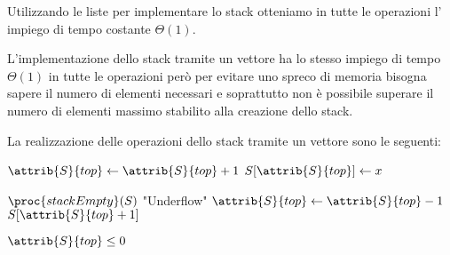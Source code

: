 Utilizzando le liste per implementare lo stack otteniamo in tutte le operazioni l'
impiego di tempo costante $\Theta(1)$.

L'implementazione dello stack tramite un vettore ha lo stesso impiego di tempo $\Theta(1)$
in tutte le operazioni però per evitare uno spreco di memoria bisogna sapere il numero
di elementi necessari e soprattutto non è possibile superare il numero di elementi massimo
stabilito alla creazione dello stack.

La realizzazione delle operazioni dello stack tramite un vettore sono le seguenti:
\begin{codebox}
\li $\attrib{S}{top} \gets \attrib{S}{top} + 1$
\li $S[\attrib{S}{top}] \gets x$
\end{codebox}

\begin{codebox}
\li \If $\proc{stackEmpty}(S)$
\li \Then \Error "Underflow"
\li \Else $\attrib{S}{top} \gets \attrib{S}{top}-1$
\li \Return $S[\attrib{S}{top}+1]$
\end{codebox}

\begin{codebox}
\li \Return $\attrib{S}{top} \leq 0$
\end{codebox}

